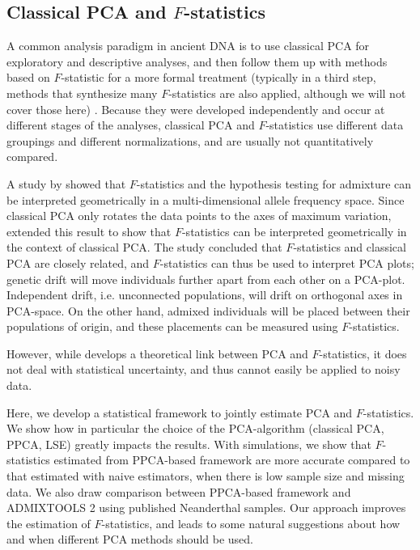 \documentclass[12pt]{article}
\begin{document}
\subsection{Classical PCA and $F$-statistics}
A common analysis paradigm in ancient DNA is to use classical PCA for exploratory and descriptive analyses, and then follow them up with methods based on $F$-statistic for a more formal treatment (typically in a third step, methods that synthesize many $F$-statistics are also applied, although we will not cover those here) \citep{orlando_ancient_2021}. Because they were developed independently and occur at different stages of the analyses, classical PCA and $F$-statistics use different data groupings and different normalizations, and are usually not quantitatively compared. 

A study by \cite{oteo-garcia_geometrical_2021} showed that $F$-statistics and the hypothesis testing for admixture can be interpreted geometrically in a multi-dimensional allele frequency space. Since classical PCA only rotates the data points to the axes of maximum variation, \cite{peter_geometric_2022} extended this result to show that $F$-statistics can be interpreted geometrically in the context of classical PCA. The study concluded that $F$-statistics and classical PCA are closely related, and $F$-statistics can thus be used to interpret PCA plots; genetic drift will move individuals further apart from each other on a PCA-plot. Independent drift, i.e. unconnected populations, will drift on orthogonal axes in PCA-space. On the other hand, admixed individuals will be placed between their populations of origin, and these placements can be measured using $F$-statistics.  

However, while \citep{peter_geometric_2022} develops a theoretical link between PCA and $F$-statistics, it does not deal with statistical uncertainty, and thus cannot easily be applied to noisy data. 

Here, we develop a statistical framework to jointly estimate PCA and $F$-statistics. We show how in particular the choice of the PCA-algorithm (classical PCA, PPCA, LSE) greatly impacts the results. With simulations, we show that $F$-statistics estimated from PPCA-based framework are more accurate compared to that estimated with naive estimators, when there is low sample size and missing data. We also draw comparison between PPCA-based framework and ADMIXTOOLS 2 using published Neanderthal samples. Our approach improves the estimation of $F$-statistics, and leads to some natural suggestions about how and when different PCA methods should be used.
\end{document}
